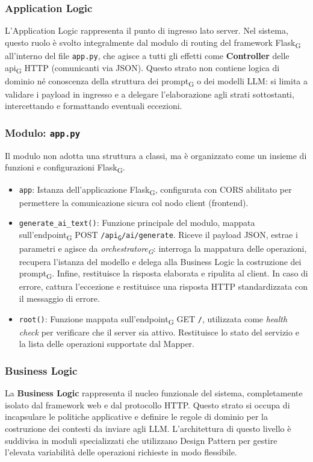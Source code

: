\documentclass[11pt,a4paper]{article}
\newcommand{\gls}[1]{#1\textsubscript{G}}
\begin{document}
\subsubsection{Application Logic}
L'Application Logic rappresenta il punto di ingresso lato server. Nel sistema, questo ruolo è svolto integralmente dal modulo di routing del framework \gls{Flask} all'interno del file \texttt{app.py}, che agisce a tutti gli effetti come \textbf{Controller} delle \gls{api} HTTP (comunicanti via JSON). Questo strato non contiene logica di dominio né conoscenza della struttura dei \gls{prompt} o dei modelli LLM: si limita a validare i payload in ingresso e a delegare l'elaborazione agli strati sottostanti, intercettando e formattando eventuali eccezioni.

\subsubsection{Modulo: \texttt{app.py}}
Il modulo non adotta una struttura a classi, ma è organizzato come un insieme di funzioni e configurazioni \gls{Flask}.
\begin{itemize}
    \item \texttt{app}: Istanza dell'applicazione \gls{Flask}, configurata con CORS abilitato per permettere la comunicazione sicura col nodo client (frontend).
    
    \item \texttt{generate\_ai\_text()}: Funzione principale del modulo, mappata sull'\gls{endpoint} POST \texttt{/\gls{api}/ai/generate}. Riceve il payload JSON, estrae i parametri e agisce da \textit{\gls{orchestratore}}: interroga la mappatura delle operazioni, recupera l'istanza del modello e delega alla Business Logic la costruzione dei \gls{prompt}. Infine, restituisce la risposta elaborata e ripulita al client. In caso di errore, cattura l'eccezione e restituisce una risposta HTTP standardizzata con il messaggio di errore.
    
    \item \texttt{root()}: Funzione mappata sull'\gls{endpoint} GET \texttt{/}, utilizzata come \textit{health check} per verificare che il server sia attivo. Restituisce lo stato del servizio e la lista delle operazioni supportate dal Mapper.
\end{itemize}

\subsubsection{Business Logic}
La \textbf{Business Logic} rappresenta il nucleo funzionale del sistema, completamente isolato dal framework web e dal protocollo HTTP. Questo strato si occupa di incapsulare le politiche applicative e definire le regole di dominio per la costruzione dei contesti da inviare agli LLM. L'architettura di questo livello è suddivisa in moduli specializzati che utilizzano Design Pattern per gestire l'elevata variabilità delle operazioni richieste in modo flessibile.
\end{document}
